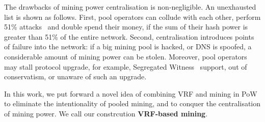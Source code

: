 The drawbacks of mining power centralisation is non-negligible.
An unexhausted list is shown as follows.
First, pool operators can collude with each other, perform 51\% attacks~\cite{} and double spend their money, if the sum of their hash power is greater than 51\% of the entire network.
Second, centralisation introduces points of failure into the network: if a big mining pool is hacked, or DNS is spoofed, a considerable amount of mining power can be stolen.
Moreover, pool operators may stall protocol upgrade, for example, Segregated Witness~\cite{segwit} support, out of conservatism, or unaware of such an upgrade.

In this work, we put forward a novel idea of combining VRF and mining in PoW to eliminate the intentionality of pooled mining, and to conquer the centralisation of mining power. We call our constrcution \textbf{VRF-based mining}.
